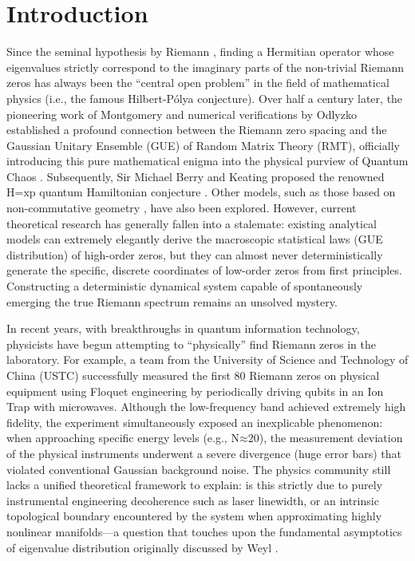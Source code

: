 \section*{Introduction}

Since the seminal hypothesis by Riemann \cite{riemann1859}, finding a Hermitian
operator whose eigenvalues strictly correspond to the imaginary parts of
the non-trivial Riemann zeros has always been the ``central open problem'' in the
field of mathematical physics (i.e., the famous Hilbert-Pólya
conjecture). Over half a century later, the pioneering work of
Montgomery \cite{montgomery1973} and numerical verifications by Odlyzko \cite{odlyzko1987}
established a profound connection between the Riemann zero spacing and
the Gaussian Unitary Ensemble (GUE) of Random Matrix Theory (RMT),
officially introducing this pure mathematical enigma into the physical
purview of Quantum Chaos \cite{berry1986}. Subsequently, Sir Michael Berry and
Keating proposed the renowned \(\text{H}\text{=}\text{xp}\) quantum
Hamiltonian conjecture \cite{berry1999}. Other models, such as those based on
non-commutative geometry \cite{connes1999}, have also been explored. However,
current theoretical research has generally fallen into a stalemate:
existing analytical models can extremely elegantly derive the
macroscopic statistical laws (GUE distribution) of high-order zeros, but
they can almost never deterministically generate the specific, discrete
coordinates of low-order zeros from first principles. Constructing a
deterministic dynamical system capable of spontaneously emerging the
true Riemann spectrum remains an unsolved mystery.

In recent years, with breakthroughs in quantum information technology,
physicists have begun attempting to ``physically'' find Riemann zeros in
the laboratory. For example, a team from the University of Science and
Technology of China (USTC) successfully measured the first 80 Riemann
zeros on physical equipment using Floquet engineering by periodically
driving qubits in an Ion Trap with microwaves. Although the
low-frequency band achieved extremely high fidelity, the experiment
simultaneously exposed an inexplicable phenomenon: when approaching
specific energy levels (e.g., \(\text{N}\text{≈20}\)), the measurement
deviation of the physical instruments underwent a severe divergence
(huge error bars) that violated conventional Gaussian background noise.
The physics community still lacks a unified theoretical framework to
explain: is this strictly due to purely instrumental engineering
decoherence such as laser linewidth, or an intrinsic topological
boundary encountered by the system when approximating highly nonlinear
manifolds---a question that touches upon the fundamental asymptotics of
eigenvalue distribution originally discussed by Weyl \cite{weyl1912}.

